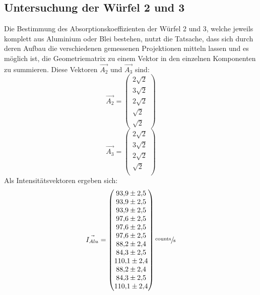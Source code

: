\subsection{Untersuchung der Würfel 2 und 3}
Die Bestimmung des Absorptionskoeffizienten der Würfel 2 und 3, welche jeweils komplett aus Aluminium oder Blei bestehen, nutzt die Tatsache, dass sich durch deren Aufbau die verschiedenen gemessenen Projektionen mitteln lassen
und es möglich ist, die Geometriematrix zu einem Vektor in den einzelnen Komponenten zu summieren. Diese Vektoren $\vec{A_2}$ und $\vec{A_3}$ sind:
\begin{equation}
	\vec{A_2}=
	\begin{pmatrix}
		2\sqrt{2} \\
		3\sqrt{2} \\
		2\sqrt{2} \\
		\sqrt{2}\\
    \sqrt{2}
	\end{pmatrix}
\end{equation}
\begin{equation}
	\vec{A_3}=
	\begin{pmatrix}
		2\sqrt{2} \\
		3\sqrt{2} \\
		2\sqrt{2} \\
		\sqrt{2}\\
	\end{pmatrix}
\end{equation}
Als Intensitätsvektoren ergeben sich:
\begin{equation}
	\vec{I_{Alu}}=
	\begin{pmatrix}
		\num{93.9 \pm 2.5} \\
		\num{93.9 \pm 2.5} \\
		\num{93.9\pm 2.5} \\
		\num{97.6\pm 2.5} \\
		\num{97.6\pm 2.5} \\
		\num{97.6\pm 2.5} \\
		\num{88.2\pm 2.4} \\
		\num{84.3\pm 2.5} \\
		\num{110.1\pm 2.4} \\
    \num{88.2\pm 2.4} \\
    \num{84.3\pm 2.5} \\
    \num{110.1\pm 2.4} \\
	\end{pmatrix}
    \sfrac{\text{counts}}{\text{s}}
	\label{eq:vecleer1}
\end{equation}

